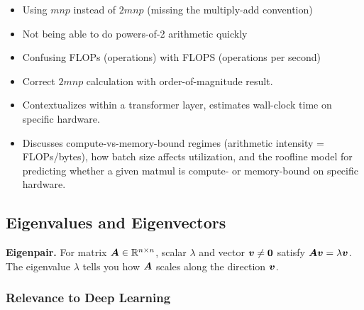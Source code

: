 \begin{interviewq}
\redflags
\begin{itemize}
    \item Using $mnp$ instead of $2mnp$ (missing the multiply-add convention)
    \item Not being able to do powers-of-2 arithmetic quickly
    \item Confusing FLOPs (operations) with FLOPS (operations per second)
\end{itemize}


\goodgreat
\begin{itemize}
    \item {} Correct $2mnp$ calculation with order-of-magnitude result.
    \item {} Contextualizes within a transformer layer, estimates wall-clock time on specific hardware.
    \item {} Discusses compute-vs-memory-bound regimes (arithmetic intensity = FLOPs/bytes), how batch size affects utilization, and the roofline model for predicting whether a given matmul is compute- or memory-bound on specific hardware.
\end{itemize}

\end{interviewq}

\subsection{Eigenvalues and Eigenvectors}

\textbf{Eigenpair.} For matrix $\bm{A} \in \mathbb{R}^{n \times n}$, scalar $\lambda$ and vector $\bm{v} \neq \bm{0}$ satisfy $\bm{A} \bm{v} = \lambda \bm{v}$. The eigenvalue $\lambda$ tells you how $\bm{A}$ scales along the direction $\bm{v}$.

\subsubsection{Relevance to Deep Learning}

